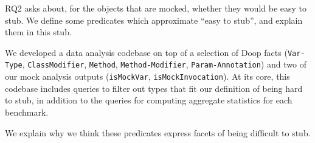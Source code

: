 RQ2 asks about, for the objects that are mocked, whether they would be easy to stub. 
We define some predicates which approximate ``easy to stub'', and explain them in this stub.



We developed a data analysis codebase on top of a selection of Doop facts (\texttt{Var-Type}, \texttt{ClassModifier}, \texttt{Method}, \texttt{Method-Modifier}, \texttt{Param-Annotation}) and two of our mock analysis outputs (\texttt{isMockVar}, \texttt{isMockInvocation}). At its core, this codebase includes queries to filter out types that fit our definition of being hard to stub, in addition to the queries for computing aggregate statistics for each benchmark.

We explain why we think these predicates express facets of being difficult to stub.








